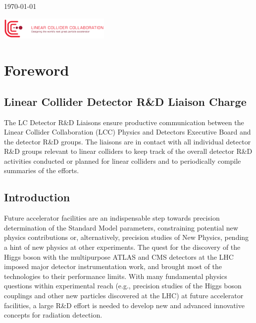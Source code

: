 \documentclass[10pt,final]{report}
\begin{document}
\begin{titlepage}
	\vfill\vfill\vfill %
	{\large\today} %
	
	
	\vfill\vfill
    \includegraphics[width=0.4\textwidth]{signature_red2-cmyk}\\[1cm] %
	
	\vfill %
	
\end{titlepage}

\tableofcontents
\chapter*{Foreword}
\section*{Linear Collider Detector R\&D Liaison Charge}
The LC Detector R\&D Liaisons ensure productive communication between the Linear Collider Collaboration (LCC) Physics and Detectors Executive Board and the detector R\&D groups. The liaisons are in contact with all individual detector R\&D groups relevant to linear colliders to keep track of the overall detector R\&D activities conducted or planned for linear colliders and to periodically compile summaries of the efforts.

\section*{Introduction}
Future accelerator facilities are an indispensable step towards precision determination of the Standard Model parameters, constraining potential new physics contributions or, alternatively, precision studies of New Physics, pending a hint of new physics at other experiments. The quest for the discovery of the Higgs boson with the multipurpose ATLAS and CMS detectors at the LHC imposed major detector instrumentation work, and brought most of the technologies to their performance limits. With many fundamental physics questions within experimental reach (e.g., precision studies of the Higgs boson couplings and other new particles discovered at the LHC) at future accelerator facilities, a large R\&D effort is needed to develop new and advanced innovative concepts for radiation detection.
\end{document}
